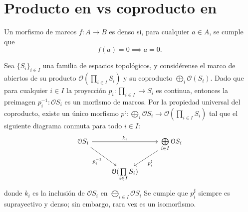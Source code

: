 \section{Producto en  vs coproducto en }
\begin{definition}
    Un morfismo de marcos $f:A\to B$ es denso si, para cualquier $a\in
    A$, se cumple que
    \[
      f(a)=0\implies a=0
    .\]
\end{definition}
Sea $\{S_i\}_{i\in I}$ una familia de espacios topológicos, y considérense el marco de abiertos de su producto $\mathcal{O}(\prod\limits_{i\in I}S_i)$ y su coproducto $\bigoplus\limits_{i}\mathcal{O}(S_i)$. Dado que para cualquier $i\in I$ la proyección $p_i:\prod\limits_{i\in I}\to S_i$ es continua, entonces la preimagen $p_i^{-1}:\mathcal{O}S_i$
es un morfismo de marcos. Por la propiedad universal del coproducto, existe un único morfismo $p^\sharp:\bigoplus\limits_{i}\mathcal{O}S_i\to\mathcal{O}(\prod\limits_{i\in I}S_i)$ tal que el siguiente diagrama conmuta para todo $i\in I$:
 \[
            \begin{tikzcd}
                \mathcal{O}S_i \ar[dr,"p_i^{-1}"'] \ar[rr,"k_i"] && \bigoplus\limits_{i\in I}\mathcal{O}S_i \ar[dl,"p_i^\sharp"]
                \\ & \mathcal{O}(\prod\limits_{i\in I}S_i)
            \end{tikzcd}
        \]
donde $k_i$ es la inclusión de $\mathcal{O}S_i$ en $\bigoplus\limits_{i\in I}\mathcal{O}S_i$
Se cumple que $p_i^\sharp$ siempre es suprayectivo y denso; sin embargo, rara vez es un isomorfismo.
